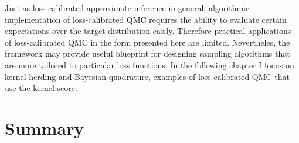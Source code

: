 Just as loss-calibrated approximate inference in general, algorithmic implementation of loss-calibrated QMC requires the ability to evaluate certain expectations over the target distribution easily. Therefore practical applications of loss-calibrated QMC in the form presented here are limited. Nevertheles, the framework may provide useful blueprint for designing sampling algotithms that are more tailored to particular loss functions. In the following chapter I focus on kernel herding and Bayesian quadrature, examples of loss-calibrated QMC that use the kernel score.

\section{Summary}

